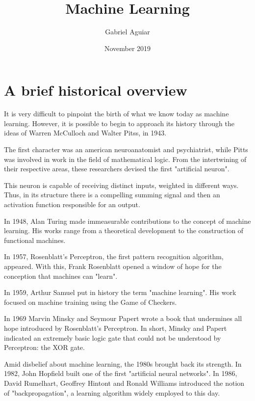 \documentclass{article}
\title{Machine Learning}
\author{Gabriel Aguiar}
\date{November 2019}
\begin{document}
\maketitle

\section{A brief historical overview}

It is very difficult to pinpoint the birth of what we know today as machine learning. However, it is possible to begin to approach its history through the ideas of Warren McCulloch and Walter Pitss, in 1943.

\hfill

The first character was an american neuroanatomist and psychiatrist, while Pitts was involved in work in the field of mathematical logic. From the intertwining of their respective areas, these researchers devised the first "artificial neuron".

\hfill

This neuron is capable of receiving distinct inputs, weighted in different ways. Thus, in its structure there is a compelling summing signal and then an activation function responsible for an output.

\hfill

In 1948, Alan Turing made immeasurable contributions to the concept of machine learning. His works range from a theoretical development to the construction of functional machines.

\hfill

In 1957, Rosenblatt's Perceptron, the first pattern recognition algorithm, appeared. With this, Frank Rosenblatt opened a window of hope for the conception that machines can "learn".

\hfill

In 1959, Arthur Samuel put in history the term "machine learning". His work focused on machine training using the Game of Checkers.

\hfill

In 1969 Marvin Minsky and Seymour Papert wrote a book that undermines all hope introduced by Rosenblatt's Perceptron. In short, Minsky and Papert indicated an extremely basic logic gate that could not be understood by Perceptron: the XOR gate.

\hfill

Amid disbelief about machine learning, the 1980s brought back its strength. In 1982, John Hopfield built one of the first "artificial neural networks". In 1986, David Rumelhart, Geoffrey Hintont and Ronald Williams introduced the notion of "backpropagation", a learning algorithm widely employed to this day.
\end{document}
